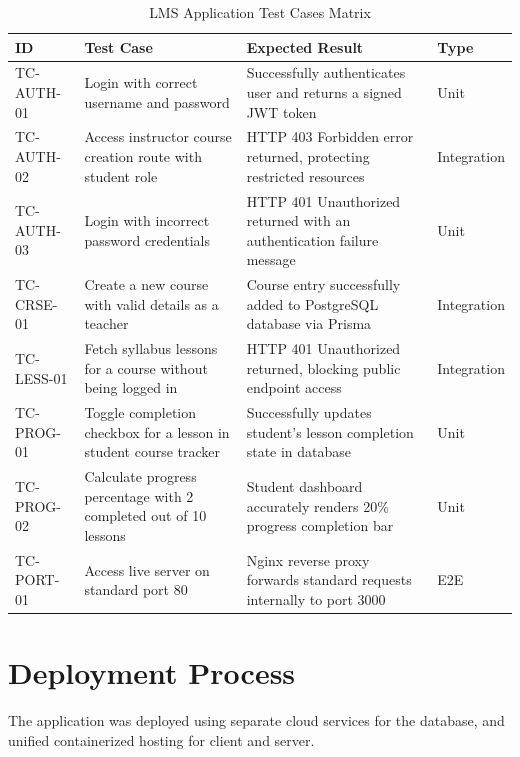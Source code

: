 \documentclass[12pt,a4paper]{article}
\begin{document}
\begin{table}[H]
    \centering
    \caption{LMS Application Test Cases Matrix}
    \vspace{0.3cm}
    \begin{tabularx}{\textwidth}{|l|X|X|l|}
        \hline
        \textbf{ID} & \textbf{Test Case} & \textbf{Expected Result} & \textbf{Type} \\
        \hline
        TC-AUTH-01 & Login with correct username and password & Successfully authenticates user and returns a signed JWT token & Unit \\
        \hline
        TC-AUTH-02 & Access instructor course creation route with student role & HTTP 403 Forbidden error returned, protecting restricted resources & Integration \\
        \hline
        TC-AUTH-03 & Login with incorrect password credentials & HTTP 401 Unauthorized returned with an authentication failure message & Unit \\
        \hline
        TC-CRSE-01 & Create a new course with valid details as a teacher & Course entry successfully added to PostgreSQL database via Prisma & Integration \\
        \hline
        TC-LESS-01 & Fetch syllabus lessons for a course without being logged in & HTTP 401 Unauthorized returned, blocking public endpoint access & Integration \\
        \hline
        TC-PROG-01 & Toggle completion checkbox for a lesson in student course tracker & Successfully updates student's lesson completion state in database & Unit \\
        \hline
        TC-PROG-02 & Calculate progress percentage with 2 completed out of 10 lessons & Student dashboard accurately renders 20\% progress completion bar & Unit \\
        \hline
        TC-PORT-01 & Access live server on standard port 80 & Nginx reverse proxy forwards standard requests internally to port 3000 & E2E \\
        \hline
    \end{tabularx}
    \label{tab:test_cases}
\end{table}

\section{Deployment Process}
The application was deployed using separate cloud services for the database, and unified containerized hosting for client and server.
\end{document}
